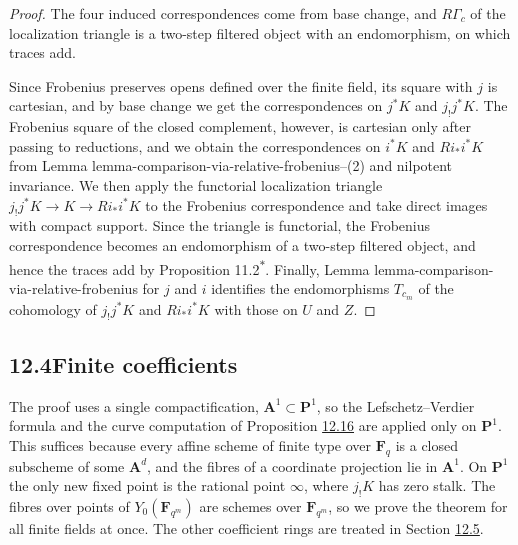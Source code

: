 \documentclass[11pt]{article}
\newcommand{\bpout}[1]{#1\textsuperscript{\hyperlink{bp-outside}{\ensuremath{\ast}}}}
\begin{document}
\begin{proof}[{Proof}]\label{bp59}%
The four induced correspondences come from base change, and \(R\Gamma_c\) of the localization triangle is a two-step filtered object with an endomorphism, on which traces add.

Since Frobenius preserves opens defined over the finite field, its square with \(j\) is cartesian, and by base change we get the correspondences on \(j^*K\) and \(j_!j^*K\). The Frobenius square of the closed complement, however, is cartesian only after passing to reductions, and we obtain the correspondences on \(i^*K\) and \(Ri_*i^*K\) from Lemma lemma-comparison-via-relative-frobenius–(2) and nilpotent invariance. We then apply the functorial localization triangle \(j_!j^*K\to K\to Ri_*i^*K\) to the Frobenius correspondence and take direct images with compact support. Since the triangle is functorial, the Frobenius correspondence becomes an endomorphism of a two-step filtered object, and hence the traces add by Proposition \bpout{11.2}. Finally, Lemma lemma-comparison-via-relative-frobenius for \(j\) and \(i\) identifies the endomorphisms \(T_{c_m}\) of the cohomology of \(j_!j^*K\) and \(Ri_*i^*K\) with those on \(U\) and \(Z\).
\end{proof}


\subsection*{\texorpdfstring{12.4\quad Finite coefficients}{12.4 Finite coefficients}}
\label{bp60}%
\label{bp61}%
The proof uses a single compactification, \(\mathbf A^1\subset\mathbf P^1\), so the Lefschetz–Verdier formula and the curve computation of Proposition \hyperref[bp49]{12.16} are applied only on \(\mathbf P^1\). This suffices because every affine scheme of finite type over \(\mathbf F_q\) is a closed subscheme of some \(\mathbf A^d\), and the fibres of a coordinate projection lie in \(\mathbf A^1\). On \(\mathbf P^1\) the only new fixed point is the rational point \(\infty\), where \(j_!K\) has zero stalk. The fibres over points of \(Y_0(\mathbf F_{q^m})\) are schemes over \(\mathbf F_{q^m}\), so we prove the theorem for all finite fields at once. The other coefficient rings are treated in Section \hyperref[bp64]{12.5}.
\end{document}
